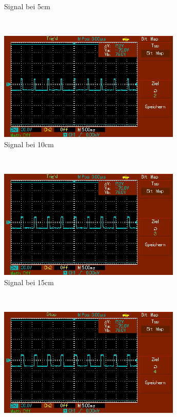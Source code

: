 \documentclass[captions=tableheading]{scrartcl}
\begin{document}
\begin{itemize}
\begin{figure}
                \caption{Signal bei 5cm}
                \label{fig:5cmled}
            \end{figure}  
            \\
            \begin{figure}   
                \centering 
                \includegraphics{Lock_In Bilder/Aufgabe 4/MAP002.pdf}
                \caption{Signal bei 10cm}
                \label{fig:10cmled}
            \end{figure}   
            \\
            \begin{figure}    
                \centering
                \includegraphics{Lock_In Bilder/Aufgabe 4/MAP003.pdf}
                \caption{Signal bei 15cm}
                \label{fig:15cmled}
            \end{figure}   
            \\
            \begin{figure} 
                \centering  
                \includegraphics{Lock_In Bilder/Aufgabe 4/MAP004.pdf}

\end{figure}
\end{itemize}
\end{document}
